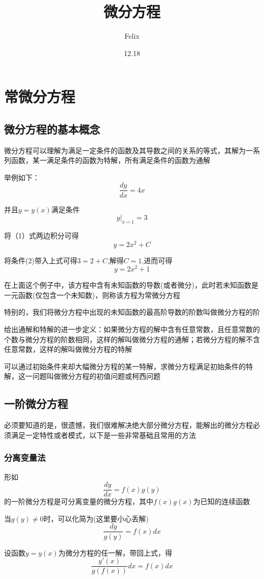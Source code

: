 \documentclass{article}
\title{微分方程}
\author{Felix}
\date{12.18}
\begin{document}
\maketitle

\section{常微分方程}
\subsection{微分方程的基本概念}
微分方程可以理解为满足一定条件的函数及其导数之间的关系的等式，其解为一系列函数，某一满足条件的函数为特解，所有满足条件的函数为通解

举例如下：
\[\frac{dy}{dx}=4x\]

并且$y=y(x)$满足条件
\[y|_{x=1}=3\]

将（1）式两边积分可得
\[y=2x^2+C\]

将条件(2)带入上式可得$3=2+C$,解得$C=1$,进而可得
\[y=2x^2+1\]

在上面这个例子中，该方程中含有未知函数的导数(或者微分)，此时若未知函数是一元函数(仅包含一个未知数)，则称该方程为常微分方程

特别的，我们将微分方程中出现的未知函数的最高阶导数的阶数叫做微分方程的阶

给出通解和特解的进一步定义：如果微分方程的解中含有任意常数，且任意常数的个数与微分方程的阶数相同，这样的解叫做微分方程的通解；若微分方程的解不含任意常数，这样的解叫做微分方程的特解

可以通过初始条件来却大幅微分方程的某一特解，求微分方程满足初始条件的特解，这一问题叫做微分方程的初值问题或柯西问题

\subsection{一阶微分方程}
必须要知道的是，很遗憾，我们很难解决绝大部分微分方程，能解出的微分方程必须满足一定特性或者模式，以下是一些非常基础且常用的方法
\subsubsection{分离变量法}
形如$$\frac{dy}{dx}=f(x)g(y)$$的一阶微分方程是可分离变量的微分方程，其中$f(x)$$g(x)$为已知的连续函数

当$g(y)\neq0$时，可以化简为(这里要小心丢解)
\[\frac{dy}{g(y)}=f(x)dx\]

设函数$y=y(x)$为微分方程的任一解，带回上式，得
\[\frac{y'(x)}{g(f(x))}dx=f(x)dx\] 
\end{document}
